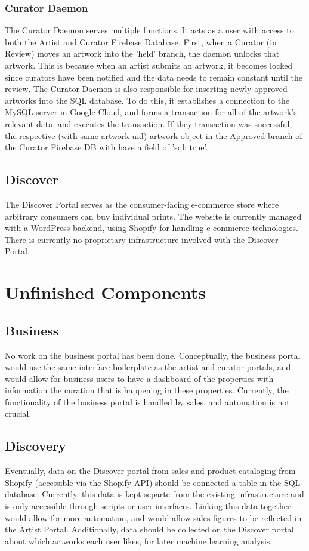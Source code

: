 \documentclass[fontsize=12pt]{scrartcl} %
\numberwithin{equation}{section} %
\numberwithin{figure}{section} %
\numberwithin{table}{section} %
\begin{document}
\subsubsection{Curator Daemon}
The Curator Daemon serves multiple functions. It acts as a user with access to both the Artist and Curator Firebase Database. First, when a Curator (in Review) moves an artwork into the 'held' branch, the daemon unlocks that artwork. This is because when an artist submits an artwork, it becomes locked since curators have been notified and the data needs to remain constant until the review.
The Curator Daemon is also responsible for inserting newly approved artworks into the SQL database. To do this, it establishes a connection to the MySQL server in Google Cloud, and forms a transaction for all of the artwork's relevant data, and executes the transaction. If they transaction was successful, the respective (with same artwork uid) artwork object in the Approved branch of the Curator Firebase DB with have a field of 'sql: true'.

\subsection{Discover}
The Discover Portal serves as the consumer-facing e-commerce store where arbitrary consumers can buy individual prints. The website is currently managed with a WordPress backend, using Shopify for handling e-commerce technologies. There is currently no proprietary infrastructure involved with the Discover Portal.

\section{Unfinished Components}
\subsection{Business}
No work on the business portal has been done. Conceptually, the business portal would use the same interface boilerplate as the artist and curator portals, and would allow for business users to have a dashboard of the properties with information the curation that is happening in these properties. Currently, the functionality of the business portal is handled by sales, and automation is not crucial.

\subsection{Discovery}
Eventually, data on the Discover portal from sales and product cataloging from Shopify (accessible via the Shopify API) should be connected a table in the SQL database. Currently, this data is kept separte from the existing infrastructure and is only accessible through scripts or user interfaces. Linking this data together would allow for more automation, and would allow sales figures to be reflected in the Artist Portal. Additionally, data should be collected on the Discover portal about which artworks each user likes, for later machine learning analysis.
\end{document}
